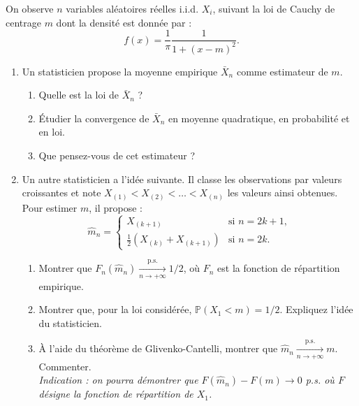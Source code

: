 \smallskip

\begin{mdframed}
\begin{exercice}
On observe $n$ variables aléatoires réelles i.i.d. $X_i$, suivant la loi de Cauchy de centrage $m$ dont la densité est donnée par :
\begin{equation*}
f(x) = \frac{1}{\pi} \frac{1}{1 + (x - m)^2}.
\end{equation*}

\begin{enumerate}
    \item Un statisticien propose la moyenne empirique $\bar{X}_n$ comme estimateur de $m$.
    \begin{enumerate}
        \item[i--] Quelle est la loi de $\bar{X}_n$ ?
        \item[ii--] Étudier la convergence de $\bar{X}_n$ en moyenne quadratique, en probabilité et en loi.
        \item[iii--] Que pensez-vous de cet estimateur ?
    \end{enumerate}
    
    \item Un autre statisticien a l’idée suivante. Il classe les observations par valeurs croissantes et note $X_{(1)} < X_{(2)} < \dots < X_{(n)}$ les valeurs ainsi obtenues. Pour estimer $m$, il propose :
    \begin{equation*}
    \hat{m}_n = \begin{cases}
    X_{(k+1)} & \text{si } n = 2k + 1, \\
    \frac{1}{2}(X_{(k)} + X_{(k+1)}) & \text{si } n = 2k.
    \end{cases}
    \end{equation*}
    \begin{enumerate}
        \item[i--] Montrer que $F_n(\hat{m}_n) \xrightarrow[n \to +\infty]{\text{p.s.}} 1/2$, où $F_n$ est la fonction de répartition empirique.
        \item[ii--] Montrer que, pour la loi considérée, $\mathbb{P}(X_1 < m) = 1/2$. Expliquez l’idée du statisticien.
        \item[iii--] À l’aide du théorème de Glivenko-Cantelli, montrer que $\hat{m}_n \xrightarrow[n \to +\infty]{\text{p.s.}} m$. Commenter.\\
        \textit{Indication : on pourra démontrer que $F(\hat{m}_n) - F(m) \to 0$ p.s. où $F$ désigne la fonction de répartition de $X_1$.}
    \end{enumerate}
\end{enumerate}
\end{exercice}
\end{mdframed}


